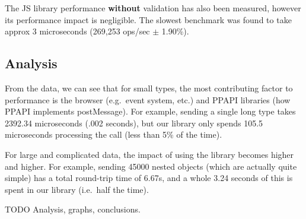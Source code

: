 The JS library performance \textbf{without} validation has also been
measured, however its performance impact is negligible. The slowest
benchmark was found to take approx 3 microseconds (269,253 ops/sec
$\pm$  1.90\%).

\subsection{Analysis}\label{analysis}

From the data, we can see that for small types, the most contributing
factor to performance is the browser (e.g.~event system, etc.) and PPAPI
libraries (how PPAPI implements postMessage). For example, sending a
single long type takes 2392.34 microseconds (.002 seconds), but our
library only spends 105.5 microseconds processing the call (less than
5\% of the time).

For large and complicated data, the impact of using the library becomes
higher and higher. For example, sending 45000 nested objects (which are
actually quite simple) has a total round-trip time of 6.67s, and a whole
3.24 seconds of this is spent in our library (i.e.~half the time).

TODO Analysis, graphs, conclusions.

